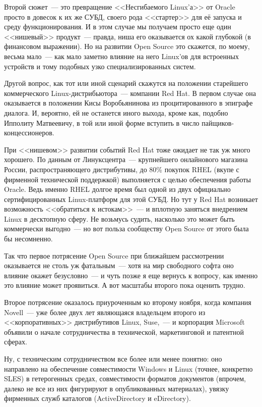Второй сюжет~--- это превращение <<Несгибаемого Linux'а>> от Oracle просто в довесок к их же СУБД, своего рода <<стартер>> для её запуска и среду функционирования. И в этом случае мы получаем просто еще один <<нишевый>> продукт~--- правда, ниша его оказывается ох какой глубокой (в финансовом выражении). Но на развитии Open Source это скажется, по моему, весьма мало~--- как мало заметно влияние на него Linux'ов для встроенных устройств и тому подобных узко специализированных систем.

Другой вопрос, как тот или иной сценарий скажутся на положении старейшего коммерческого Linux-дистрибьютора~--- компании Red Hat. В первом случае она оказывается в положении Кисы Воробьянинова из процитированного в эпиграфе диалога. И, вероятно, ей не останется иного выхода, кроме как, подобно Ипполиту Матвеевичу, в той или иной форме вступить в число пайщиков-концессионеров.

При <<нишевом>> развитии событий Red Hat тоже ожидает не так уж много хорошего. По данным от Линуксцентра~--- крупнейшего онлайнового магазина России, распространяющего дистрибутивы, до 80\% покупок RHEL (вкупе с фирменной технической поддержкой) выполняется с целью обеспечения работы Oracle. Ведь именно RHEL долгое время был одной из двух официально сертифицированных Linux-платформ для этой СУБД. Но тут у Red Hat возникает возможность <<обратиться к истокам>>~--- и вплотную заняться внедрением Linux в десктопную сферу. Не возьмусь судить, насколько это может быть коммерчески выгодно~--- но вот польза сообществу Open Source от этого была бы несомненно.

Так что первое потрясение Open Source при ближайшем рассмотрении оказывается не столь уж фатальным~--- хотя на мир свободного софта оно влияние окажет безусловно~--- и чуть позже я еще вернусь к вопросу, как именно это влияние может проявиться. А вот масштабы второго пока оценить трудно.

Второе потрясение оказалось приуроченным ко второму ноября, когда компания Novell~--- уже более двух лет являющаяся владельцем второго из <<корпоративных>> дистрибутивов Linux, Suse,~--- и корпорация Microsoft объявили о начале сотрудничества в технической, маркетинговой и патентной сферах.

Ну, с техническим сотрудничеством все более или менее понятно: оно направлено на обеспечение совместимости Windows и Linux (точнее, конкретно SLES) в гетерогенных средах, совместимости форматов документов (впрочем, далеко не все из них фигурируют в опубликованных материалах), увязку фирменных служб каталогов (ActiveDirectory и eDirectory).

